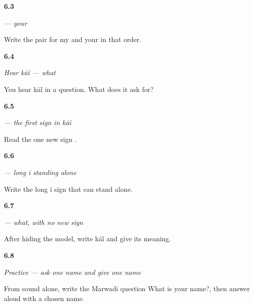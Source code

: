 \noindent\begin{minipage}[t]{\linewidth}
\raggedright
\hypertarget{review-MW-C05-tharo-contrast}{\textbf{6.3}} \emph{ — your}\par
\small Write the pair for my and your in that order.
\end{minipage}\par\medskip

\noindent\begin{minipage}[t]{\linewidth}
\raggedright
\hypertarget{review-MW-C05-hear-kain-meaning}{\textbf{6.4}} \emph{Hear \emph{kāĩ} — what}\par
\small You hear kāĩ in a question. What does it ask for?
\end{minipage}\par\medskip

\noindent\begin{minipage}[t]{\linewidth}
\raggedright
\hypertarget{review-MW-W05-ka-read}{\textbf{6.5}} \emph{ — the first sign in \emph{kāĩ}}\par
\small Read the one new sign .
\end{minipage}\par\medskip

\noindent\begin{minipage}[t]{\linewidth}
\raggedright
\hypertarget{review-MW-W05-ii-independent-choice}{\textbf{6.6}} \emph{ — long \emph{ī} standing alone}\par
\small Write the long ī sign that can stand alone.
\end{minipage}\par\medskip

\noindent\begin{minipage}[t]{\linewidth}
\raggedright
\hypertarget{review-MW-C05-kain-delayed}{\textbf{6.7}} \emph{ — what, with no new sign}\par
\small After hiding the model, write kāĩ and give its meaning.
\end{minipage}\par\medskip

\noindent\begin{minipage}[t]{\linewidth}
\raggedright
\hypertarget{review-MW-C05-practice-name-exchange}{\textbf{6.8}} \emph{Practice — ask one name and give one name}\par
\small From sound alone, write the Marwadi question What is your name?, then answer aloud with a chosen name.
\end{minipage}\par\medskip

